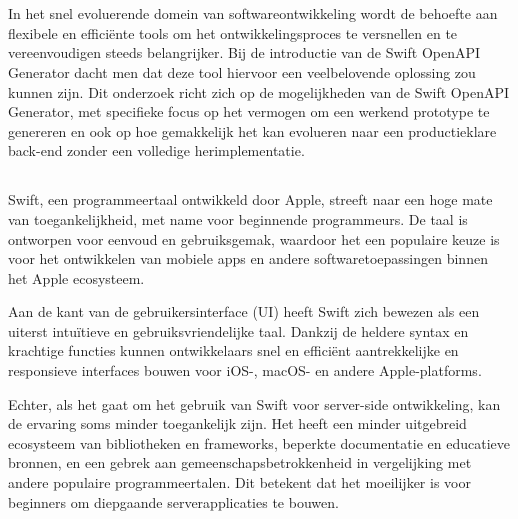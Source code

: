 
\chapter{}%
\label{ch:inleiding}

In het snel evoluerende domein van softwareontwikkeling wordt de behoefte aan flexibele en efficiënte tools om het ontwikkelingsproces te versnellen en te vereenvoudigen steeds belangrijker. Bij de introductie van de Swift OpenAPI Generator dacht men dat deze tool hiervoor een veelbelovende oplossing zou kunnen zijn. Dit onderzoek richt zich op de mogelijkheden van de Swift OpenAPI Generator, met specifieke focus op het vermogen om een werkend prototype te genereren en ook op hoe gemakkelijk het kan evolueren naar een productieklare back-end zonder een volledige herimplementatie.
\newpage


\section{}%
\label{sec:probleemstelling}

Swift, een programmeertaal ontwikkeld door Apple, streeft naar een hoge mate van toegankelijkheid, met name voor beginnende programmeurs. De taal is ontworpen voor eenvoud en gebruiksgemak, waardoor het een populaire keuze is voor het ontwikkelen van mobiele apps en andere softwaretoepassingen binnen het Apple ecosysteem.

Aan de kant van de gebruikersinterface (UI) heeft Swift zich bewezen als een uiterst intuïtieve en gebruiksvriendelijke taal. Dankzij de heldere syntax en krachtige functies kunnen ontwikkelaars snel en efficiënt aantrekkelijke en responsieve interfaces bouwen voor iOS-, macOS- en andere Apple-platforms. 

Echter, als het gaat om het gebruik van Swift voor server-side ontwikkeling, kan de ervaring soms minder toegankelijk zijn. Het heeft een minder uitgebreid ecosysteem van bibliotheken en frameworks, beperkte documentatie en educatieve bronnen, en een gebrek aan gemeenschapsbetrokkenheid in vergelijking met andere populaire programmeertalen. Dit betekent dat het moeilijker is voor beginners om diepgaande serverapplicaties te bouwen.

